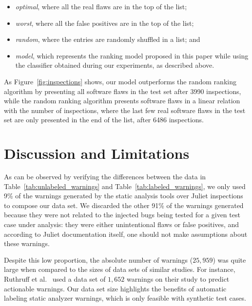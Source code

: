\begin{itemize}
\item\textit{optimal}, where all the real flaws are in the top of the list;
\item\textit{worst}, where all the false positives are in the top of the list;
\item\textit{random}, where the entries are randomly shuffled in a list; and
\item\textit{model}, which represents the ranking model proposed in this paper while
using the classifier obtained during our experiments, as described above.
\end{itemize}

As Figure~\ref{fig:inspections} shows, our model outperforms the random ranking
algorithm by presenting all software flaws in the test set after 3990
inspections, while the random ranking algorithm presents software flaws in a
linear relation with the number of inspections, where the last few real
software flaws in the test set are only presented in the end of the list, after
6486 inspections.


\section{Discussion and Limitations}
\label{sec:discussion}

As can be observed by verifying the differences between the data in
Table~\ref{tab:unlabeled_warnings} and Table~\ref{tab:labeled_warnings}, we
only used 9\% of the warnings generated by the static analysis tools over
Juliet inspections to compose our data set. We discarded the other 91\% of the
warnings generated because they were not related to the injected bugs being
tested for a given test case under analysis: they were either unintentional
flaws or false positives, and according to Juliet documentation itself, one
should not make assumptions about these warnings.

Despite this low proportion, the absolute number of warnings ($25,959$) was quite large
when compared to the sizes of data sets of similar studies. For instance, Ruthruff et
al.~\cite{ruthruff_predicting_2008} used a data set of $1,652$ warnings on
their study to predict actionable warnings. Our data set size highlights the
benefits of automatic labeling static analyzer warnings, which is only feasible
with synthetic test cases.

